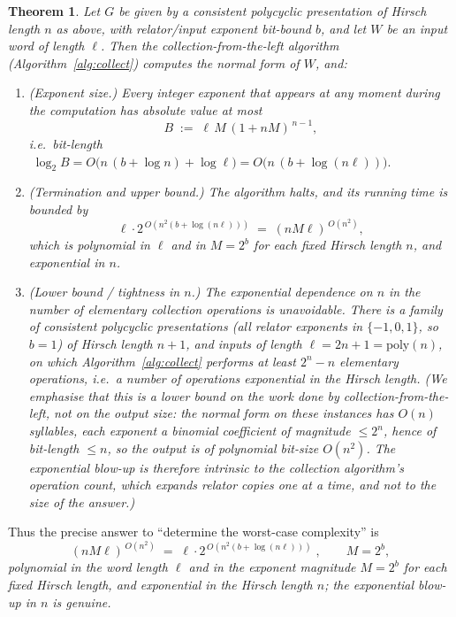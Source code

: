 \documentclass{amsart}
\newtheorem{theorem}{Theorem}
\theoremstyle{definition}
\begin{document}
\begin{theorem}\label{thm:main}
Let $G$ be given by a consistent polycyclic presentation of Hirsch length $n$ as above,
with relator/input exponent bit-bound $b$, and let $W$ be an input word of length $\ell$.
Then the collection-from-the-left algorithm \textup{(}Algorithm~\textup{\ref{alg:collect})}
computes the normal form of $W$, and:
\begin{enumerate}
\item \textup{(Exponent size.)} Every integer exponent that appears at any moment during the
computation has absolute value at most
\begin{equation}\label{eq:expbound}
B \;:=\; \ell\,M\,(1+nM)^{\,n-1},
\end{equation}
i.e.\ bit-length $\;\log_2 B=O\!\bigl(n\,(b+\log n)+\log\ell\bigr)=O\!\bigl(n\,(b+\log(n\ell))\bigr).$
\item \textup{(Termination and upper bound.)} The algorithm halts, and its running time is
bounded by
\begin{equation}\label{eq:upper}
\ell\cdot 2^{\,O\!\left(n^2(b+\log(n\ell))\right)}\;=\;(nM\ell)^{\,O(n^2)},
\end{equation}
which is polynomial in $\ell$ and in $M=2^{b}$ for each fixed Hirsch length $n$, and
exponential in $n$.
\item \textup{(Lower bound / tightness in $n$.)} The exponential dependence on $n$ in the
\emph{number of elementary collection operations} is unavoidable. There is a family of
consistent polycyclic presentations \textup{(}all relator exponents in $\{-1,0,1\}$, so
$b=1$\textup{)} of Hirsch length $n+1$, and inputs of length $\ell=2n+1=\mathrm{poly}(n)$, on
which Algorithm~\textup{\ref{alg:collect}} performs at least $2^{n}-n$ elementary operations,
i.e.\ a number of operations exponential in the Hirsch length. \textup{(}We emphasise that this
is a lower bound on the \emph{work done by collection-from-the-left}, not on the output size:
the normal form on these instances has $O(n)$ syllables, each exponent a binomial coefficient
of magnitude $\le 2^{n}$, hence of bit-length $\le n$, so the output is of polynomial bit-size
$O(n^2)$. The exponential blow-up is therefore intrinsic to the collection \emph{algorithm}'s
operation count, which expands relator copies one at a time, and not to the size of the
answer.\textup{)}
\end{enumerate}
\end{theorem}

\noindent
Thus the precise answer to ``determine the worst-case complexity'' is
\[
\boxed{\;(nM\ell)^{\,O(n^2)}\;=\;\ell\cdot 2^{\,O(n^2(b+\log(n\ell)))}\;,\qquad M=2^{b},\;}
\]
\emph{polynomial in the word length $\ell$ and in the exponent magnitude $M=2^{b}$ for each
fixed Hirsch length, and exponential in the Hirsch length $n$; the exponential blow-up in $n$
is genuine.}
\end{document}
